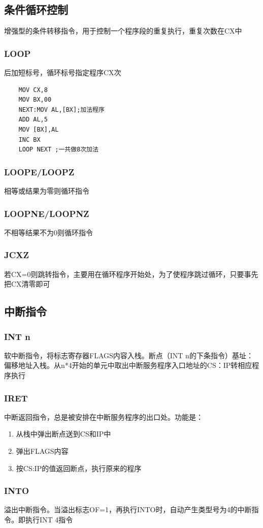 \subsection{条件循环控制}
增强型的条件转移指令，用于控制一个程序段的重复执行，重复次数在CX中
\subsubsection{LOOP}
后加短标号，循环标号指定程序CX次
\begin{lstlisting}
    MOV CX,8
    MOV BX,00 
    NEXT:MOV AL,[BX];加法程序 
    ADD AL,5
    MOV [BX],AL 
    INC BX 
    LOOP NEXT ;一共做8次加法
\end{lstlisting}
\subsubsection{LOOPE/LOOPZ}
相等或结果为零则循环指令
\subsubsection{LOOPNE/LOOPNZ}
不相等结果不为0则循环指令
\subsubsection{JCXZ}
若CX=0则跳转指令，主要用在循环程序开始处，为了使程序跳过循环，只要事先把CX清零即可
\subsection{中断指令}
\subsubsection{INT n}
软中断指令，将标志寄存器FLAGS内容入栈。断点（INT n的下条指令）基址：偏移地址入栈。从n*4开始的单元中取出中断服务程序入口地址的CS：IP转相应程序执行
\subsubsection{IRET}
中断返回指令，总是被安排在中断服务程序的出口处。功能是：
\begin{enumerate}
    \item 从栈中弹出断点送到CS和IP中
    \item 弹出FLAGS内容
    \item 按CS:IP的值返回断点，执行原来的程序
\end{enumerate}
\subsubsection{INTO}
溢出中断指令。当溢出标志OF=1，再执行INTO时，自动产生类型号为4的中断指令。即执行INT 4指令 

